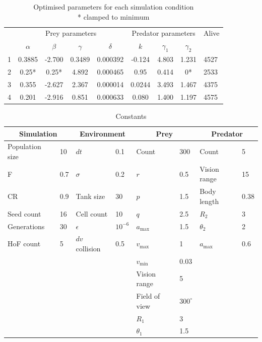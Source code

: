 \documentclass[12pt]{article}
\begin{document}
\begin{table}[H]
    \centering
    \begin{tabular}{lcccccccl}
  & \multicolumn{4}{c}{Prey parameters}& \multicolumn{3}{c}{Predator parameters} &Alive\\
          &  $\alpha$&  $\beta$&  $\gamma$&  $\delta$&  $k$&  $\gamma_1$& $\gamma_2$ &\\
          1&  0.3885&  -2.700&  0.3489&  0.000392&  -0.124&  4.803&  1.231&4527\\
          2&  0.25*&  0.25*&  4.892&  0.000465&  0.95&  0.414&  0*&2533\\
          3&  0.355&  -2.627&  2.367&  0.000014&  0.0244&  3.493&  1.467&4375\\
          4&  0.201&  -2.916&  0.851&  0.000633&  0.080&  1.400&  1.197&4575\\
    \end{tabular}
    \caption{Optimised parameters for each simulation condition\\
    * clamped to minimum}
    \label{tab:Results}
\end{table}
\begin{table}[h!]
\centering
\begin{tabular}{ll ll ll ll}
\multicolumn{2}{c}{\textbf{Simulation}} &
\multicolumn{2}{c}{\textbf{Environment}} &
\multicolumn{2}{c}{\textbf{Prey}} &
\multicolumn{2}{c}{\textbf{Predator}} \\
\hline
Population size & 10 & $dt$ & 0.1 & Count & 300 & Count & 5 \\
F & 0.7 & $\sigma$ & 0.2 & $r$ & 0.5 & Vision range & 15 \\
CR & 0.9 & Tank size & 30 & $p$ & 1.5 & Body length & 0.38 \\
Seed count & 16 & Cell count & 10 & $q$ & 2.5 & $R_2$ & 3 \\
Generations& 30& $\epsilon$ & $10^{-6}$ & $a_{\max}$ & 1.5 & $\theta_2$ & 2 \\
HoF count & 5 & $dv$ collision& 0.5 & $v_{\max}$ & 1 & $a_{\max}$ & 0.6 \\
& & & & $v_{\min}$ & 0.03 & & \\
& & & & Vision range & 5 & & \\
& & & & Field of view & $300^\circ$& & \\
& & & & $R_1$ & 3 & & \\
& & & & $\theta_1$ & 1.5 & & \\
\end{tabular}
\caption{Constants}
\label{tab:constants}
\end{table}
\end{document}
